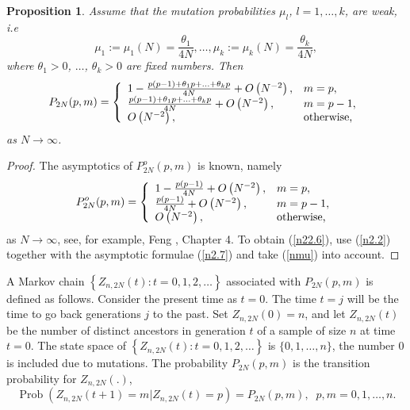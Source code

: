 \documentclass[12pt]{amsart}
\newtheorem{prop}[thm]{Proposition}
\theoremstyle{definition}
\numberwithin{equation}{section}
\DeclareMathOperator{\Prob}{Prob}
\begin{document}
\begin{prop}\label{Proposition5.6.1} Assume that the mutation probabilities $\mu_l$, $l=1,\ldots, k$,
are weak, i.e
\begin{equation}\label{nmu}
\mu_1:=\mu_1(N)=\frac{\theta_1}{4N},\ldots,\mu_k:=\mu_k(N)=\frac{\theta_k}{4N},
\end{equation}
where $\theta_1>0$, $\ldots$, $\theta_k>0$ are fixed numbers. Then
\begin{equation}\label{n22.6}
P_{2N}(p,m)=\left\{
  \begin{array}{ll}
    1-\frac{p(p-1)+\theta_1p+\ldots+\theta_kp}{4N}+O\left(N^{-2}\right), &  m=p,\\
    \frac{p(p-1)+\theta_1p+\ldots+\theta_kp}{4N}+O\left(N^{-2}\right), & m=p-1, \\
    O\left(N^{-2}\right), & \hbox{otherwise,}
  \end{array}
\right.
\end{equation}
as $N\longrightarrow\infty$.
\end{prop}
\begin{proof}The asymptotics of $P_{2N}^{o}(p,m)$ is known, namely
\begin{equation}\label{n2.7}
P_{2N}^{o}(p,m)=\left\{
  \begin{array}{ll}
    1-\frac{p(p-1)}{4N}+O\left(N^{-2}\right), &  m=p,\\
    \frac{p(p-1)}{4N}+O\left(N^{-2}\right), & m=p-1, \\
    O\left(N^{-2}\right), & \hbox{otherwise,}
  \end{array}
\right.
\end{equation}
as $N\longrightarrow\infty$, see, for example, Feng \cite{Feng},
Chapter 4. To obtain (\ref{n22.6}), use (\ref{n2.2}) together
with the asymptotic formulae (\ref{n2.7}) and take (\ref{nmu})
into account.
\end{proof}
A Markov chain $\left\{Z_{n,2N}(t): t=0,1,2,\ldots\right\}$ associated with $P_{2N}(p,m)$ is defined
as follows. Consider the present time as $t=0$. The time $t=j$ will be the time to go back generations $j$ to the past.
Set $Z_{n,2N}(0)=n$, and let $Z_{n,2N}(t)$ be the number of distinct ancestors in generation $t$ of a sample of size $n$ at time $t=0$. The state space of $\left\{Z_{n,2N}(t): t=0,1,2,\ldots\right\}$ is $\{0,1,\ldots,n\}$, the number $0$ is included due to mutations. The probability $P_{2N}(p,m)$
is the transition probability for $Z_{n,2N}(.)$,
\begin{equation}\label{n5.7.3}
\Prob\left(Z_{n,2N}(t+1)=m|Z_{n,2N}(t)=p\right)
=P_{2N}(p,m),\;\; p,m=0,1,\ldots,n.
\end{equation}
\end{document}
